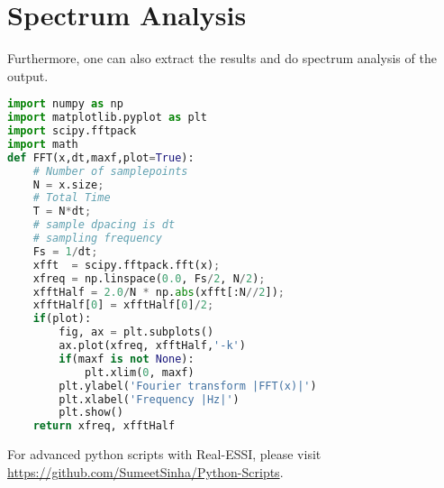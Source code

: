 \section{Spectrum Analysis}
Furthermore, one can also extract the results and do spectrum analysis of 
the output.
\begin{lstlisting}[frame=single, language=Python]
import numpy as np
import matplotlib.pyplot as plt
import scipy.fftpack
import math
def FFT(x,dt,maxf,plot=True):
	# Number of samplepoints
	N = x.size;
	# Total Time 
	T = N*dt;
	# sample dpacing is dt
	# sampling frequency
	Fs = 1/dt;
	xfft  = scipy.fftpack.fft(x);
	xfreq = np.linspace(0.0, Fs/2, N/2);
	xfftHalf = 2.0/N * np.abs(xfft[:N//2]);
	xfftHalf[0] = xfftHalf[0]/2;
	if(plot):
		fig, ax = plt.subplots()
		ax.plot(xfreq, xfftHalf,'-k')
		if(maxf is not None):
			plt.xlim(0, maxf)
		plt.ylabel('Fourier transform |FFT(x)|')
		plt.xlabel('Frequency |Hz|')
		plt.show()
	return xfreq, xfftHalf
\end{lstlisting}

For advanced python scripts with Real-ESSI, please visit \url{https://github.com/SumeetSinha/Python-Scripts}.






